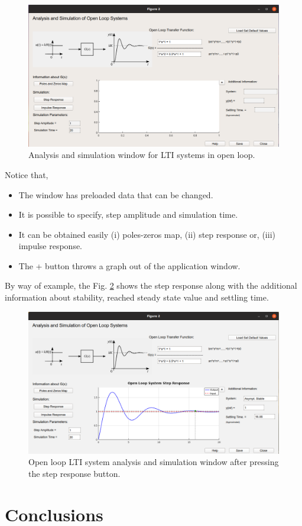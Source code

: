 \begin{figure}[H]
	\centering
	\includegraphics[scale=0.5]{./figuras/chapter_gla/fig01_ejemGLA.png}
	\caption{Analysis and simulation window for LTI systems in open loop.}
	\label{chp_la_fig01_GLA}
\end{figure}

Notice that, 
\begin{itemize}
	\item The window has preloaded data that can be changed.
	\item It is possible to specify, step amplitude and simulation time.
	\item It can be obtained easily  (i) poles-zeros map, (ii) step response or, (iii) impulse response.
	\item The + button throws a graph out of the application window.
\end{itemize}

\vspace{0.4cm}
By way of example, the Fig. \ref{chp_la_fig02_GLA} shows the step response along with the additional  information about stability, reached steady state value and settling time.

\begin{figure}[H]
	\centering
	\includegraphics[scale=0.5]{./figuras/chapter_gla/fig02_ejemGLA.png}
	\caption{Open loop LTI system analysis and simulation window after pressing the step response button.}
	\label{chp_la_fig02_GLA}
\end{figure}



\section{Conclusions}

